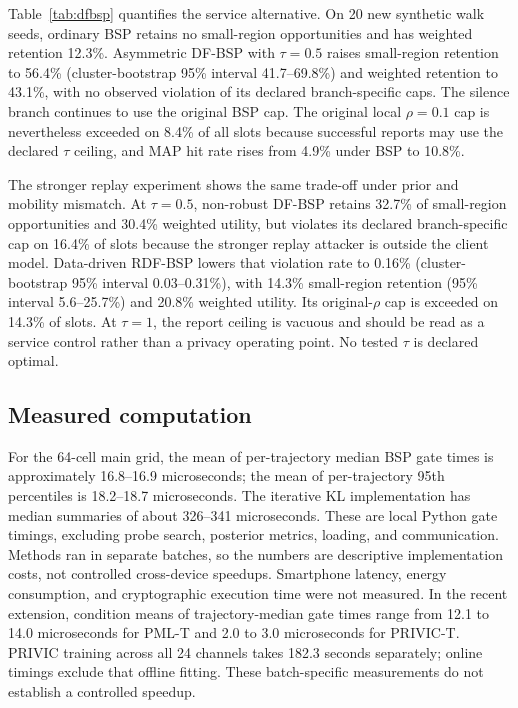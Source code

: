 \documentclass[review,12pt]{elsarticle}
\begin{document}
Table~\ref{tab:dfbsp} quantifies the service alternative. On 20 new synthetic walk seeds, ordinary BSP retains no small-region opportunities and has weighted retention 12.3\%. Asymmetric DF-BSP with $\tau=0.5$ raises small-region retention to 56.4\% (cluster-bootstrap 95\% interval 41.7--69.8\%) and weighted retention to 43.1\%, with no observed violation of its declared branch-specific caps. The silence branch continues to use the original BSP cap. The original local $\rho=0.1$ cap is nevertheless exceeded on 8.4\% of all slots because successful reports may use the declared $\tau$ ceiling, and MAP hit rate rises from 4.9\% under BSP to 10.8\%.

The stronger replay experiment shows the same trade-off under prior and mobility mismatch. At $\tau=0.5$, non-robust DF-BSP retains 32.7\% of small-region opportunities and 30.4\% weighted utility, but violates its declared branch-specific cap on 16.4\% of slots because the stronger replay attacker is outside the client model. Data-driven RDF-BSP lowers that violation rate to 0.16\% (cluster-bootstrap 95\% interval 0.03--0.31\%), with 14.3\% small-region retention (95\% interval 5.6--25.7\%) and 20.8\% weighted utility. Its original-$\rho$ cap is exceeded on 14.3\% of slots. At $\tau=1$, the report ceiling is vacuous and should be read as a service control rather than a privacy operating point. No tested $\tau$ is declared optimal.

\begin{table}[tbp]
\centering
\caption{Disclosure-floor-aware service frontier at $\rho=0.1$. ``$\rho$ exceed.'' reports exceedance of the original local BSP cap; ``Branch viol.'' reports violation of the declared asymmetric caps in Eq.~\eqref{eq:dfcap}. Weighted and small-region retention emphasize fine-grained service. RDF-BSP uses the six validation-selected models.}
\label{tab:dfbsp}{\scriptsize\setlength{\tabcolsep}{3pt}}
\end{table}

\subsection{Measured computation}
For the 64-cell main grid, the mean of per-trajectory median BSP gate times is approximately 16.8--16.9 microseconds; the mean of per-trajectory 95th percentiles is 18.2--18.7 microseconds. The iterative KL implementation has median summaries of about 326--341 microseconds. These are local Python gate timings, excluding probe search, posterior metrics, loading, and communication. Methods ran in separate batches, so the numbers are descriptive implementation costs, not controlled cross-device speedups. Smartphone latency, energy consumption, and cryptographic execution time were not measured. In the recent extension, condition means of trajectory-median gate times range from 12.1 to 14.0 microseconds for PML-T and 2.0 to 3.0 microseconds for PRIVIC-T. PRIVIC training across all 24 channels takes 182.3 seconds separately; online timings exclude that offline fitting. These batch-specific measurements do not establish a controlled speedup.
\end{document}
